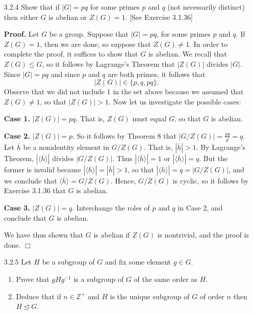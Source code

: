 \documentclass[9pt]{article}
\newcommand{\qed}{\hfill \ensuremath{\Box}}
\newcommand{\cyc}[1]{\langle #1 \rangle}
\newcommand{\Z}{\mathbb{Z}}
\begin{document}
\begin{enumerate}
   \item[3.2.4]   Show that if $|G| = pq$ for some primes $p$ and $q$ (not
                  necessarily distinct) then either $G$ is abelian or
                  $Z(G) = 1$. [See Exercise 3.1.36]

      \textbf{Proof.} Let $G$ be a group. Suppose that $|G| = pq$, for some
      primes $p$ and $q$. If $Z(G) = 1$, then we are done, so suppose that
      $Z(G) \neq 1$. In order to complete the proof, it suffices to show that
      $G$ is abelian. We recall that $Z(G) \le G$, so it follows by Lagrange's 
      Theorem that $|Z(G)|$ divides $|G|$. Since $|G| = pq$ and since $p$ and
      $q$ are both primes, it follows that
      $$|Z(G)| \in \{p, q, pq\}.$$
      Observe that we did not include 1 in the set above because we assumed that
      $Z(G) \neq 1$, so that $|Z(G)| > 1$. Now let us investigate the possible
      cases:

      \textbf{Case 1.} $|Z(G)| = pq$. That is, $Z(G)$ must equal $G$, so that
      $G$ is abelian.

      \textbf{Case 2.} $|Z(G)| = p$. So it follows by Theorem 8 that
      $|G/Z(G)| = \frac{pq}{p} = q$. Let $\overline{h}$ be a nonidentity element 
      in $G/Z(G)$. That is, $|\overline{h}| > 1$. By Lagrange's Theorem,
      $|\cyc{\overline{h}}|$ divides $|G/Z(G)|$. Thus $|\cyc{\overline{h}}| = 1$ 
      or $|\cyc{\overline{h}}| = q$. But the former is invalid because
      $|\cyc{\overline{h}}| = |\overline{h}| > 1$, so that
      $|\cyc{\overline{h}}| = q = |G/Z(G)|$, and we conclude
      that $\cyc{\overline{h}} = G/Z(G)$. Hence, $G/Z(G)$ is cyclic, so it
      follows by Exercise 3.1.36 that $G$ is abelian.

      \textbf{Case 3.} $|Z(G)| = q$. Interchange the roles of $p$ and $q$ in
      Case 2, and conclude that $G$ is abelian.

      We have thus shown that $G$ is abelian if $Z(G)$ is nontrivial, and the
      proof is done. \qed      
   \item[3.2.5]   Let $H$ be a subgroup of $G$ and fix some element $g \in G$.
                  \begin{enumerate}
                     \item Prove that $gHg^{-1}$ is a subgroup of $G$ of the
                           same order as $H$.
                     \item Deduce that if $n \in \Z^+$ and $H$ is the unique
                           subgroup of $G$ of order $n$ then
                           $H \trianglelefteq G$.
                  \end{enumerate}


\end{enumerate}
\end{document}
